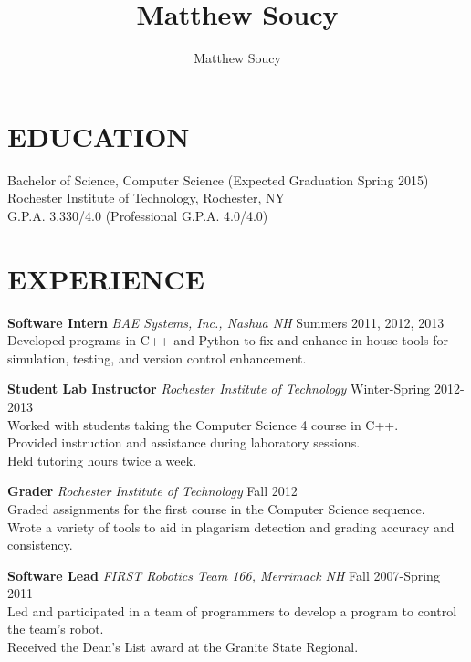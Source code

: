 \documentclass[line]{res}
\author{Matthew Soucy}
\title{Matthew Soucy}
\begin{document}
\setlength{\textheight}{11.5in} %
\address{\large 2433 Nathaniel Rochester Hall\\
		Rochester, NY 14623\\
		(585) 204-7402}
\begin{resume}

\section{EDUCATION}

	Bachelor of Science, Computer Science (Expected Graduation Spring 2015)\\
	Rochester Institute of Technology, Rochester, NY\\
	G.P.A. 3.330/4.0 (Professional G.P.A. 4.0/4.0)

\section{EXPERIENCE}

	\textbf{Software Intern}
	\textit{BAE Systems, Inc., Nashua NH}
	\hfill
	Summers 2011, 2012, 2013\\
	Developed programs in C++ and Python to fix and enhance in-house tools for simulation, testing, and version control enhancement.

	\textbf{Student Lab Instructor}
	\textit{Rochester Institute of Technology}
	\hfill
	Winter-Spring 2012-2013\\
	Worked with students taking the Computer Science 4 course in C++.\\
	Provided instruction and assistance during laboratory sessions.\\
	Held tutoring hours twice a week.

	\textbf{Grader}
	\textit{Rochester Institute of Technology}
	\hfill
	Fall 2012\\
	Graded assignments for the first course in the Computer Science sequence.\\
	Wrote a variety of tools to aid in plagarism detection and grading accuracy and consistency.

	\textbf{Software Lead}
	\textit{FIRST Robotics Team 166, Merrimack NH}
	\hfill
	Fall 2007-Spring 2011\\
	Led and participated in a team of programmers to develop a program to control the team's robot.\\
	Received the Dean's List award at the Granite State Regional.


\end{resume}
\end{document}
